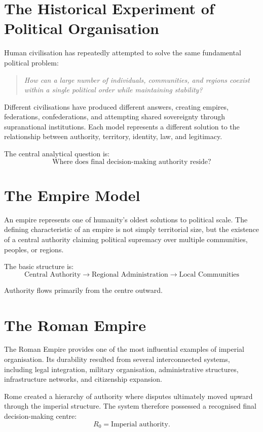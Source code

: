 \documentclass[11pt,openany]{book}
\theoremstyle{plain}
\theoremstyle{definition}
\begin{document}
\section*{The Historical Experiment of Political Organisation}

Human civilisation has repeatedly attempted to solve the same fundamental political problem:
\begin{quote}
\textit{How can a large number of individuals, communities, and regions coexist within a single political order while maintaining stability?}
\end{quote}

Different civilisations have produced different answers, creating empires, federations, confederations, and attempting shared sovereignty through supranational institutions. Each model represents a different solution to the relationship between authority, territory, identity, law, and legitimacy. 

The central analytical question is:
\[
\boxed{
\text{Where does final decision-making authority reside?}
}
\]

\section*{The Empire Model}

An empire represents one of humanity's oldest solutions to political scale. The defining characteristic of an empire is not simply territorial size, but the existence of a central authority claiming political supremacy over multiple communities, peoples, or regions.

The basic structure is:
\[
\text{Central Authority}
\longrightarrow
\text{Regional Administration}
\longrightarrow
\text{Local Communities}
\]

Authority flows primarily from the centre outward.

\section*{The Roman Empire}

The Roman Empire provides one of the most influential examples of imperial organisation. Its durability resulted from several interconnected systems, including legal integration, military organisation, administrative structures, infrastructure networks, and citizenship expansion.

Rome created a hierarchy of authority where disputes ultimately moved upward through the imperial structure. The system therefore possessed a recognised final decision-making centre:
\[
R_0 = \text{Imperial authority}.
\]
\end{document}
